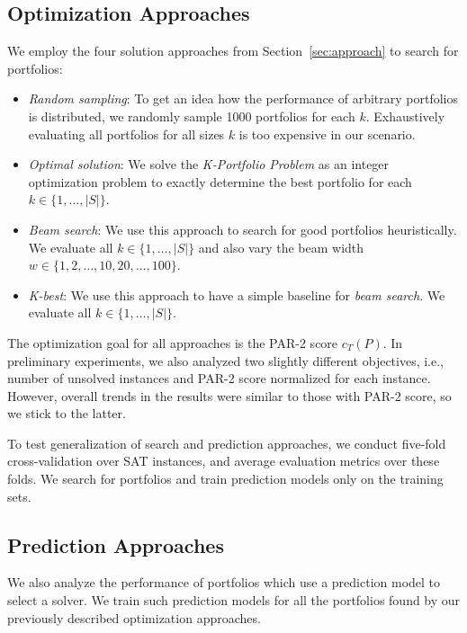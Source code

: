 \documentclass[conference]{IEEEtran}
\begin{document}
\subsection{Optimization Approaches}

We employ the four solution approaches from Section~\ref{sec:approach} to search for portfolios:

\begin{itemize}
	\item \emph{Random sampling}:
	To get an idea how the performance of arbitrary portfolios is distributed, we randomly sample 1000 portfolios for each $k$.
	Exhaustively evaluating all portfolios for all sizes $k$ is too expensive in our scenario.
	\item \emph{Optimal solution}:
	We solve the \emph{K-Portfolio Problem} as an integer optimization problem to exactly determine the best portfolio for each $k \in \{1, \dots, |S|\}$.
	\item \emph{Beam search}: 
	We use this approach to search for good portfolios heuristically.
	We evaluate all $k \in \{1, \dots, |S|\}$ and also vary the beam width $w \in \{1, 2, \dots, 10, 20, \dots, 100\}$.
	\item \emph{K-best}:
	We use this approach to have a simple baseline for \emph{beam search}.
	We evaluate all $k \in \{1, \dots, |S|\}$.
\end{itemize}

The optimization goal for all approaches is the PAR-2 score $c_T(P)$.
In preliminary experiments, we also analyzed two slightly different objectives, i.e., number of unsolved instances and PAR-2 score normalized for each instance.
However, overall trends in the results were similar to those with PAR-2 score, so we stick to the latter.

To test generalization of search and prediction approaches, we conduct five-fold cross-validation over SAT instances, and average evaluation metrics over these folds. 
We search for portfolios and train prediction models only on the training sets.

\subsection{Prediction Approaches}

We also analyze the performance of portfolios which use a prediction model to select a solver. 
We train such prediction models for all the portfolios found by our previously described optimization approaches. 
\end{document}
